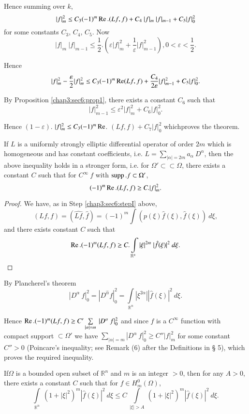 Hence summing over $k$,
$$
| f |^2_m \leq C_3 (-1)^m \operatorname{Re}. (Lf, f) + C_4 ~ | f |_m ~ | f |_{m-1} +
C_5 | f |^2_0 
$$
for some constants $C_3$, $C_4$, $C_5$. Now
$$
| f |_m ~ | f |_{m-1} \leq \frac{1}{2}. (\varepsilon | f |^2_m +
\frac{1}{\varepsilon} | f |^2_{m-1}), 0 < \varepsilon < \frac{1}{2}. 
$$

Hence
$$
| f |^2_m - \frac{\varepsilon}{2} | f |^2_m \leq C_3 (-1)^m \operatorname{Re} (Lf,
f) + \frac{C_4}{2 \varepsilon} | f |^2_{m-1} + C_5 | f |^2_0. 
$$

By Proposition \ref{chap3:sec6:prop1}, there exists a constant $C_6$ such that 
$$
| f |^2_{m-1} \leq \varepsilon^2 | f |^2_m + C_6 | f |^2_0.
$$

Hence $(1- \varepsilon )$. $| f |^2_m \leq C_3 (-1)^m \operatorname{Re}$. $(Lf, f) +
C_7 | f |^2_0$ which\pageoriginale proves the theorem. 

\begin{remark*}%
  If $L$ is a uniformly strongly elliptic differential operator of
  order $2m$ which is homogeneous and has constant coefficients,
  i.e. $L = \sum\limits_{| \alpha | = 2m} a_\alpha ~ D^\alpha$, then
  the above inequality holds in a stronger form, i.e. for $\Omega'
  \subset\subset \Omega$, there exists a constant $C$ such that for $C^\infty
  ~ f$  with $\operatorname{supp}. f \subset \Omega'$, 
  $$
  (-1)^m \operatorname{Re}. (Lf, f) \geq C. | f |^2_m.
  $$
\end{remark*}

\begin{proof}%
  We have, as in Step \ref{chap3:sec6:stepI} above,
  $$
  (Lf, f) = (\hat{Lf}, \hat{f}) = (-1)^m \int (p(\xi) \hat{f}
  (\xi), \hat{f}(\xi)) ~ d\xi, 
  $$
  and there exists constant $C$ such that
  $$
  \operatorname{Re}. (-1)^m (Lf, f) \geq C. \int\limits_{\mathbb{R}^n} | \xi |^{2m}
  ~ | \hat{f} (\xi) |^2 ~ d\xi. 
  $$
\end{proof}

By Plancherel's theorem
$$
| D^\alpha ~ f |^2_0 = | D^{\hat{\alpha}}f |^2_0 =
\int\limits_{\mathbb{R}^n} | \xi^{2\alpha} | | \hat{f} (\xi) |^2 ~ d
\xi. 
$$

Hence $\operatorname{Re}. (-1)^m (Lf, f) \geq C' \sum\limits_{| \alpha | = m} ~ |
D^\alpha ~ f |^2_0$ and since $f$ is a $C^\infty$ function with
compact support $\subset \Omega'$ we have $\sum\limits_{| \alpha | =
  m} | D^\alpha ~ f |^2_0 \geq C'' | f |^2_m$ for some constant $C'' >
0$ (Poincare's inequality; see Remark (6) after the Definitions in \S
5), which proves the required inequality. 

\begin{proposition}\label{chap3:sec6:prop2}%
  If\pageoriginale $\Omega$ is a bounded open subset of $\mathbb{R}^n$ and $m$ is an
  integer $>0$, then for any $A > 0$, there exists a constant $C$ such
  that for $f \in H^0_m (\Omega)$, 
  $$
  \int\limits_{\mathbb{R}^n} ~ (1 + | \xi |^2 )^m | \hat{f} (\xi) |^2
  ~ d\xi \leq C ~\int\limits_{| \xi | > A} ~ (1+|\xi|^2)^m|
  \hat{f}(\xi)|^2 ~ d\xi. 
  $$
\end{proposition}

